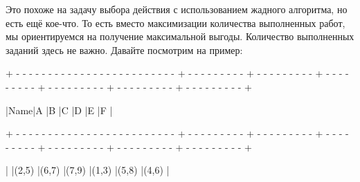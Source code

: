 
\vspace{\baselineskip}
Это похоже на задачу выбора действия с использованием жадного алгоритма, но есть ещё кое-что. То есть вместо максимизации количества выполненных работ, мы ориентируемся на получение максимальной выгоды. Количество выполненных заданий здесь не важно. Давайте посмотрим на пример: 


\vspace{\baselineskip}
\begin{tcolorbox}
{\tiny{+ - - - - - - - - - - - - - - - - - - - - - - - - - + - - - - - - - - - + - - - - - - - - - + - - - - - - - - - + - - - - - - - - - + - - - - - - - - - + - - - - - - - - - +}}

\hspace{0.4mm}|\hspace{17.6mm}Name\hspace{17.6mm}|\hspace{6.57mm}A\hspace{6.57mm} |\hspace{6.57mm}B\hspace{6.57mm} |\hspace{6.57mm}C\hspace{6.57mm} |\hspace{6.57mm}D\hspace{6.57mm} |\hspace{6.57mm}E\hspace{6.57mm} |\hspace{6.8mm}F\hspace{6.8mm} |

{\tiny{+ - - - - - - - - - - - - - - - - - - - - - - - - - + - - - - - - - - - + - - - - - - - - - + - - - - - - - - - + - - - - - - - - - + - - - - - - - - - + - - - - - - - - - +}}

\hspace{0.4mm}|\hspace{0.7mm}
|\hspace{3.85mm}(2,5)\hspace{3.85mm} |\hspace{3.85mm}(6,7)\hspace{3.85mm} |\hspace{3.85mm}(7,9)\hspace{3.85mm} |\hspace{3.85mm}(1,3)\hspace{3.85mm} |\hspace{3.85mm}(5,8)\hspace{3.85mm} |\hspace{3.85mm}(4,6)\hspace{3.85mm} |


\end{tcolorbox}
